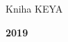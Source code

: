 
\begin{titlepage}
	\centering

	\vspace*{0.2\textheight} 

	{\LARGE Kniha KEYA} %
	
	\vspace*{0.05\textheight} 
	
	\textbf{\LARGE 2019}\\[\baselineskip] %
	
	
	\vfill
	

\end{titlepage}
